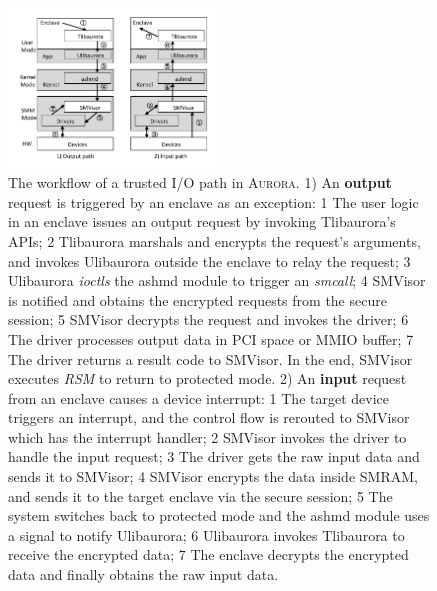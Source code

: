\documentclass[journal,twocolumn,letterpaper,10pt]{IEEEtran}
\begin{document}
\begin{figure}
	\centering
	\includegraphics[width=0.49\textwidth]{figures/workflow.pdf} %
	\caption{The workflow of a trusted I/O path in \textsc{Aurora}. %
	1) An \textbf{output} request is triggered by an enclave as an exception:
\textcircled{\scriptsize{1}} The user logic in an enclave issues an output request by invoking  Tlibaurora's APIs;
\textcircled{\scriptsize{2}} Tlibaurora marshals and encrypts the request's arguments, and invokes Ulibaurora outside the enclave to relay the request;
\textcircled{\scriptsize{3}} Ulibaurora \emph{ioctls} the ashmd module to trigger an \textit{smcall};
\textcircled{\scriptsize{4}} SMVisor is notified and obtains the encrypted requests from the secure session;
\textcircled{\scriptsize{5}} SMVisor decrypts the request and invokes the driver;
\textcircled{\scriptsize{6}} The driver processes output data in PCI space or MMIO buffer;
\textcircled{\scriptsize{7}} The driver returns a result code to SMVisor. In the end, SMVisor executes \textit{RSM} to return to protected mode. 
	2) An \textbf{input} request from an enclave causes a device interrupt:
\textcircled{\scriptsize{1}} The target device triggers an interrupt, and the control flow is rerouted to SMVisor which has the interrupt handler;
\textcircled{\scriptsize{2}} SMVisor invokes the driver to handle the input request;
\textcircled{\scriptsize{3}} The driver gets the raw input data and sends it to SMVisor;
\textcircled{\scriptsize{4}} SMVisor encrypts the data inside SMRAM, and sends it to the target enclave via the secure session;
\textcircled{\scriptsize{5}} The system switches back to protected mode and the ashmd module uses a signal to notify Ulibaurora;
\textcircled{\scriptsize{6}} Ulibaurora invokes Tlibaurora to receive the encrypted data;
\textcircled{\scriptsize{7}} The enclave decrypts the encrypted data and finally obtains the raw input data.
	}
	\label{fig:workflow}
\end{figure}
\end{document}
